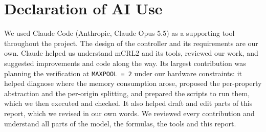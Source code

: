 \section{Declaration of AI Use}
\label{sec:ai-use}
We used Claude Code (Anthropic, Claude Opus 5.5) as a supporting tool throughout the project. The design of the controller and its requirements are our own. Claude helped us understand mCRL2 and its tools, reviewed our work, and suggested improvements and code along the way. Its largest contribution was planning the verification at \texttt{MAXPOOL = 2} under our hardware constraints: it helped diagnose where the memory consumption arose, proposed the per-property abstraction and the per-origin splitting, and prepared the scripts to run them, which we then executed and checked. It also helped draft and edit parts of this report, which we revised in our own words. We reviewed every contribution and understand all parts of the model, the formulas, the tools and this report.

\appendix


